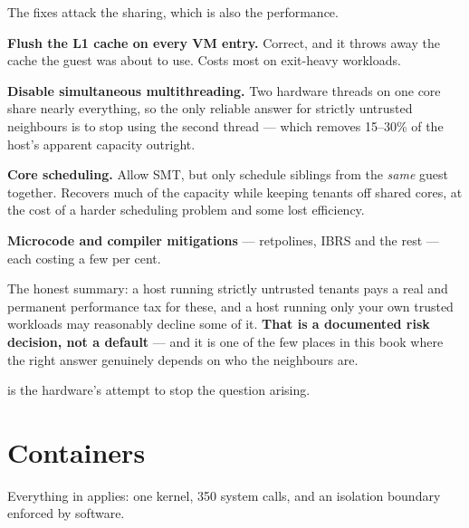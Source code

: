 \begin{conceptbox}
The fixes attack the sharing, which is also the performance.

\begin{tight}
  \item \textbf{Flush the L1 cache on every VM entry.} Correct, and it throws
        away the cache the guest was about to use. Costs most on
        exit-heavy workloads.
  \item \textbf{Disable simultaneous multithreading.} Two hardware threads on
        one core share nearly everything, so the only reliable answer for
        strictly untrusted neighbours is to stop using the second thread ---
        which removes 15--30\% of the host's apparent capacity outright.
  \item \textbf{Core scheduling.} Allow SMT, but only schedule siblings from
        the \emph{same} guest together. Recovers much of the capacity while
        keeping tenants off shared cores, at the cost of a harder scheduling
        problem and some lost efficiency.
  \item \textbf{Microcode and compiler mitigations} --- retpolines, IBRS and
        the rest --- each costing a few per cent.
\end{tight}

\smallskip
The honest summary: a host running strictly untrusted tenants pays a real and
permanent performance tax for these, and a host running only your own trusted
workloads may reasonably decline some of it. \textbf{That is a documented risk
decision, not a default} --- and it is one of the few places in this book where
the right answer genuinely depends on who the neighbours are.

\smallskip
{} is the hardware's attempt to stop the question arising.
\end{conceptbox}

\section{Containers}

Everything in  applies: one kernel, 350 system calls, and an
isolation boundary enforced by software.

